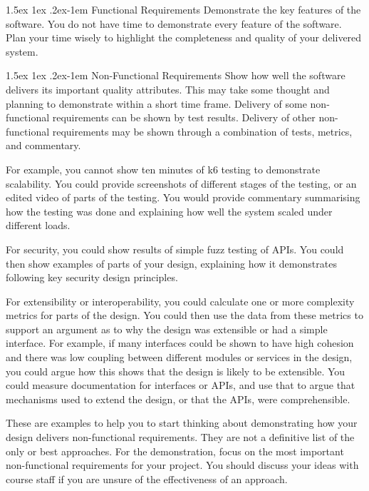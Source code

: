 \documentclass{csse4400}
\makeatletter
\renewcommand{\paragraph}{%
  \@startsection{paragraph}{4}%
  {\z@}{1.5ex \@plus 1ex \@minus .2ex}{-1em}%
  {\normalfont\normalsize\bfseries}%
}
\makeatother
\begin{document}
\paragraph{Functional Requirements} Demonstrate the key features of the software.
You do not have time to demonstrate every feature of the software.
Plan your time wisely to highlight the completeness and quality of your delivered system.

\paragraph{Non-Functional Requirements} Show how well the software delivers its important quality attributes.
This may take some thought and planning to demonstrate within a short time frame.
Delivery of some non-functional requirements can be shown by test results.
Delivery of other non-functional requirements may be shown through a combination of tests, metrics, and commentary.

For example, you cannot show ten minutes of k6 testing to demonstrate scalability.
You could provide screenshots of different stages of the testing, or an edited video of parts of the testing.
You would provide commentary summarising how the testing was done and explaining how well the system scaled under different loads.

For security, you could show results of simple fuzz testing of APIs.
You could then show examples of parts of your design, explaining how it demonstrates following key security design principles.

For extensibility or interoperability, you could calculate one or more complexity metrics for parts of the design.
You could then use the data from these metrics to support an argument as to why the design was extensible or had a simple interface.
For example, if many interfaces could be shown to have high cohesion and there was low coupling between different modules
or services in the design, you could argue how this shows that the design is likely to be extensible.
You could measure documentation for interfaces or APIs,
and use that to argue that mechanisms used to extend the design, or that the APIs, were comprehensible.

These are examples to help you to start thinking about demonstrating how your design delivers non-functional requirements.
They are not a definitive list of the only or best approaches.
For the demonstration, focus on the most important non-functional requirements for your project.
You should discuss your ideas with course staff if you are unsure of the effectiveness of an approach.
\end{document}
